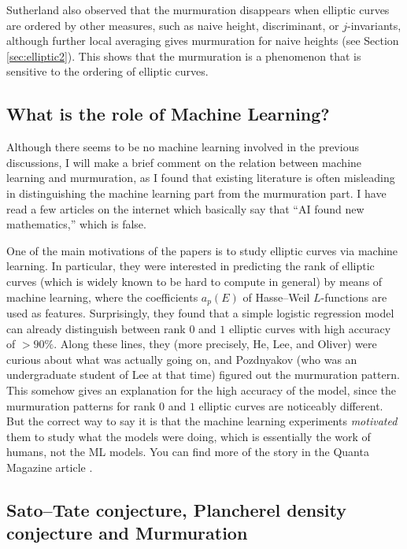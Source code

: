Sutherland also observed that the murmuration disappears when elliptic curves are ordered by other measures, such as naive height, discriminant, or $j$-invariants, although further local averaging gives murmuration for naive heights (see Section \ref{sec:elliptic2}).
This shows that the murmuration is a phenomenon that is sensitive to the ordering of elliptic curves.


\subsection{What is the role of Machine Learning?}

Although there seems to be no machine learning involved in the previous discussions, I will make a brief comment on the relation between machine learning and murmuration, as I found that existing literature is often misleading in distinguishing the machine learning part from the murmuration part.
I have read a few articles on the internet which basically say that ``AI found new mathematics,'' which is false.

One of the main motivations of the papers \cite{he2023machine,he2024murmurations} is to study elliptic curves via machine learning.
In particular, they were interested in predicting the rank of elliptic curves (which is widely known to be hard to compute in general) by means of machine learning, where the coefficients $a_p(E)$ of Hasse--Weil $L$-functions are used as features.
Surprisingly, they found that a simple logistic regression model can already distinguish between rank $0$ and $1$ elliptic curves with high accuracy of $>90\%$.
Along these lines, they (more precisely, He, Lee, and Oliver) were curious about what was actually going on, and Pozdnyakov (who was an undergraduate student of Lee at that time) figured out the murmuration pattern.
This somehow gives an explanation for the high accuracy of the model, since the murmuration patterns for rank $0$ and $1$ elliptic curves are noticeably different.
But the correct way to say it is that the machine learning experiments \emph{motivated} them to study what the models were doing, which is essentially the work of humans, not the ML models.
You can find more of the story in the Quanta Magazine article \cite{chiou2024elliptic}.


\subsection{Sato--Tate conjecture, Plancherel density conjecture and Murmuration}


